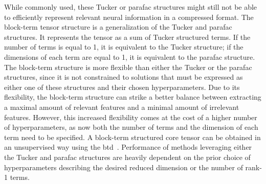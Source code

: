 \documentclass[twocolumn]{article}
\begin{document}


While commonly used, these Tucker or \ac{parafac} structures might still not be able to
efficiently represent relevant neural information in a compressed format.
The block-term tensor structure is a generalization of the Tucker and
\ac{parafac} structures.
It represents the tensor as a sum of Tucker structured terms.
If the number of terms is equal to 1, it is equivalent to the Tucker structure;
if the dimensions of each term are equal to 1, it is equivalent to the \ac{parafac}
structure.
The block-term structure is more flexible than either the Tucker or the \ac{parafac}
structures, since it is not constrained to solutions that must be expressed as
either one of these structures and their chosen hyperparameters.
Due to its flexibility, the block-term structure can strike a better
balance between extracting a maximal amount of relevant features and a minimal
amount of irrelevant features.
However, this increased flexibility comes at the cost of a higher number of
hyperparameters, as now both the number of terms and the dimension of
each term need to be specified.
A block-term structured core tensor can be obtained in an unsupervised way using
the \ac{btd}~\cite{DeLathauwer2008,DeLathauwer2008a,DeLathauwer2008b,Rontogiannis2021}.
Performance of methods leveraging either the Tucker and \ac{parafac} structures are
heavily dependent on the prior choice of hyperparameters describing
the desired reduced dimension or the number of rank-1 terms.
\end{document}

